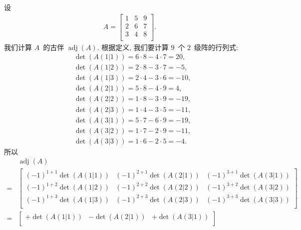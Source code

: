\begin{example}
    设
    \begin{align*}
        A =
        \begin{bmatrix}
            1 & 5 & 9 \\
            2 & 6 & 7 \\
            3 & 4 & 8 \\
        \end{bmatrix}.
    \end{align*}
    我们计算 \(A\)~的古伴 \(\operatorname{adj} {(A)}\).
    根据定义, 我们要计算 \(9\)~个 \(2\)~级阵的行列式:
    \begin{align*}
         & \det {(A(1|1))} = 6 \cdot 8 - 4 \cdot 7 = 20,  \\
         & \det {(A(1|2))} = 2 \cdot 8 - 3 \cdot 7 = -5,  \\
         & \det {(A(1|3))} = 2 \cdot 4 - 3 \cdot 6 = -10, \\
         & \det {(A(2|1))} = 5 \cdot 8 - 4 \cdot 9 = 4,   \\
         & \det {(A(2|2))} = 1 \cdot 8 - 3 \cdot 9 = -19, \\
         & \det {(A(2|3))} = 1 \cdot 4 - 3 \cdot 5 = -11, \\
         & \det {(A(3|1))} = 5 \cdot 7 - 6 \cdot 9 = -19, \\
         & \det {(A(3|2))} = 1 \cdot 7 - 2 \cdot 9 = -11, \\
         & \det {(A(3|3))} = 1 \cdot 6 - 2 \cdot 5 = -4.
    \end{align*}
    所以
    \begin{align*}
             & \operatorname{adj} {(A)}
        \\
        = {} &
        \begin{bmatrix}
            (-1)^{1+1} \det {(A(1|1))}
             & (-1)^{2+1} \det {(A(2|1))}
             & (-1)^{3+1} \det {(A(3|1))} \\
            (-1)^{1+2} \det {(A(1|2))}
             & (-1)^{2+2} \det {(A(2|2))}
             & (-1)^{3+2} \det {(A(3|2))} \\
            (-1)^{1+3} \det {(A(1|3))}
             & (-1)^{2+3} \det {(A(2|3))}
             & (-1)^{3+3} \det {(A(3|3))} \\
        \end{bmatrix}
        \\
        = {} &
        \begin{bmatrix}
            +\det {(A(1|1))}
             & -\det {(A(2|1))}
             & +\det {(A(3|1))} \\

\end{bmatrix}
\end{align*}
\end{example}
